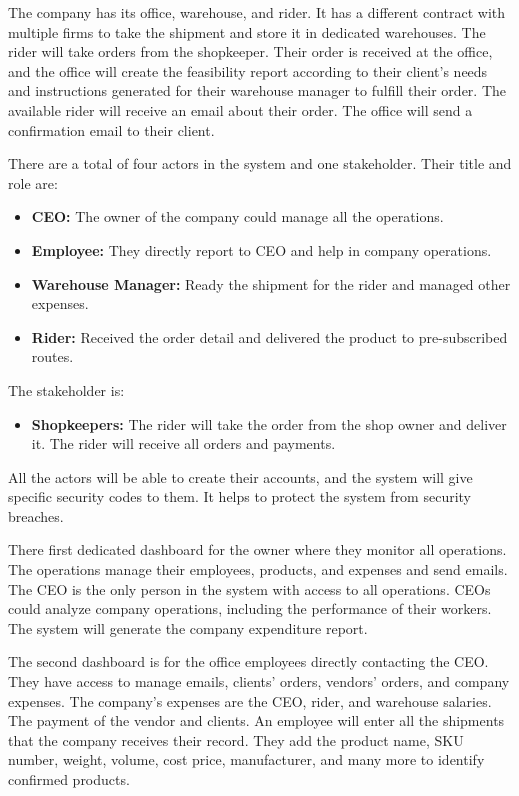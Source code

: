 \documentclass[12pt,a4paper]{report}
\begin{document}
The company has its office, warehouse, and rider. 
It has a different contract with multiple firms to take the shipment and store it in dedicated warehouses. The rider will take orders from the shopkeeper. Their order is received at the office, and the office will create the feasibility report according to their client's needs and instructions generated for their warehouse manager to fulfill their order. The available rider will receive an email about their order. The office will send a confirmation email to their client. 
 
There are a total of four actors in the system and one stakeholder. Their title and role are:
\begin{itemize}
\item \textbf{ CEO:} The owner of the company could manage all the operations.
\item \textbf{Employee:} They directly report to CEO and help in company operations.  
\item \textbf{Warehouse Manager:} Ready the shipment for the rider and managed other expenses.
\item \textbf{Rider:} Received the order detail and delivered the product to pre-subscribed routes.
\end{itemize}
The stakeholder is:
\begin{itemize}
\item \textbf{Shopkeepers:} The rider will take the order from the shop owner and deliver it. The rider will receive all orders and payments.
\end{itemize}
All the actors will be able to create their accounts, and the system will give specific security codes to them. It helps to protect the system from security breaches.
 
There first dedicated dashboard for the owner where they monitor all operations. The operations manage their employees, products, and expenses and send emails. The CEO is the only person in the system with access to all operations. CEOs could analyze company operations, including the performance of their workers. The system will generate the company expenditure report.
 
The second dashboard is for the office employees directly contacting the CEO. They have access to manage emails, clients' orders, vendors' orders, and company expenses. The company's expenses are the CEO, rider, and warehouse salaries. The payment of the vendor and clients. An employee will enter all the shipments that the company receives their record. They add the product name, SKU number, weight, volume, cost price, manufacturer, and many more to identify confirmed products.
 
\end{document}
